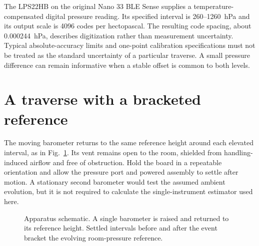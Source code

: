 The LPS22HB on the original Nano 33 BLE Sense supplies a temperature-compensated digital pressure reading. Its specified interval is 260--1260~hPa and its output scale is 4096 codes per hectopascal\cite{lps22hb}. The resulting code spacing, about 0.000244~hPa, describes digitization rather than measurement uncertainty. Typical absolute-accuracy limits and one-point calibration specifications must not be treated as the standard uncertainty of a particular traverse. A small pressure difference can remain informative when a stable offset is common to both levels.

\section{A traverse with a bracketed reference}
The moving barometer returns to the same reference height around each elevated interval, as in Fig.~\ref{fig:pressure-apparatus}. Its vent remains open to the room, shielded from handling-induced airflow and free of obstruction. Hold the board in a repeatable orientation and allow the pressure port and powered assembly to settle after motion. A stationary second barometer would test the assumed ambient evolution, but it is not required to calculate the single-instrument estimator used here.

\begin{figure}[!b]
\centering
{}
\caption{Apparatus schematic. A single barometer is raised and returned to its reference height. Settled intervals before and after the event bracket the evolving room-pressure reference.}
\label{fig:pressure-apparatus}
\end{figure}

